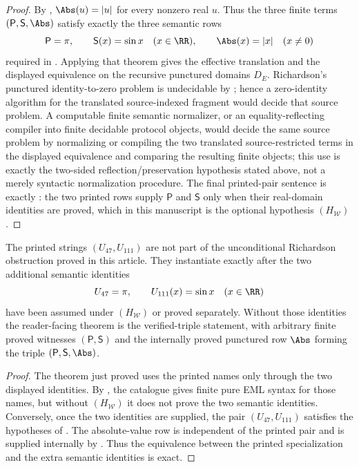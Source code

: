 \begin{proof}
By ,
\(\Abs(u)=|u|\) for every nonzero real \(u\).  Thus the three finite terms
\((\mathsf P,\mathsf S,\Abs)\) satisfy exactly the three semantic rows
\[
  \mathsf P=\pi,
  \qquad \mathsf S(x)=\sin x\quad(x\in\RR),
  \qquad \Abs(x)=|x|\quad(x\ne0)
\]
required in .  Applying that
theorem gives the effective translation and the displayed equivalence on the
recursive punctured domains \(D_E\).  Richardson's punctured identity-to-zero
problem is undecidable by ; hence a
zero-identity algorithm for the translated source-indexed fragment would decide
that source problem.  A computable finite semantic normalizer, or an
equality-reflecting compiler into finite decidable protocol objects, would decide
the same source problem by normalizing or compiling the two translated
source-restricted terms in the displayed equivalence and comparing the resulting
finite objects; this use is exactly the two-sided reflection/preservation
hypothesis stated above, not a merely syntactic normalization procedure.  The
final printed-pair sentence is exactly
: the two printed rows supply
\(\mathsf P\) and \(\mathsf S\) only when their real-domain identities are proved,
which in this manuscript is the optional hypothesis \((H_{\mathcal W})\).
\end{proof}

\begin{corollary}
\label{cor:printed-richardson-specialization-conditional}
The printed strings \((U_{47},U_{111})\) are not part of the unconditional
Richardson obstruction proved in this article.  They instantiate
 exactly after the two
additional semantic identities
\[
  U_{47}=\pi,
  \qquad U_{111}(x)=\sin x\quad(x\in\RR)
\]
have been assumed under \((H_{\mathcal W})\) or proved separately.  Without those
identities the reader-facing theorem
is the verified-triple statement, with arbitrary finite proved witnesses
\((\mathsf P,\mathsf S)\) and the internally proved punctured row \(\Abs\) forming
the triple \((\mathsf P,\mathsf S,\Abs)\).
\end{corollary}

\begin{proof}
The theorem just proved uses the printed names only through the two displayed
identities.  By , the catalogue gives finite pure
EML syntax for those names, but without \((H_{\mathcal W})\) it does not prove
the two semantic identities.  Conversely, once the two identities are supplied,
the pair \((U_{47},U_{111})\) satisfies the hypotheses of
.  The absolute-value row
is independent of the printed pair and is supplied internally by
.  Thus the equivalence between the
printed specialization and the extra semantic identities is exact.
\end{proof}

